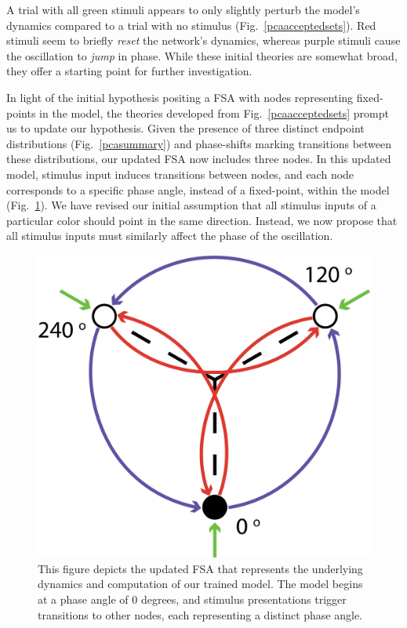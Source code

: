 \documentclass[conference]{IEEEtran}
\begin{document}
A trial with all green stimuli appears to only slightly perturb the model's dynamics compared to a trial with no stimulus (Fig.~\ref{pcaacceptedsets}). Red stimuli seem to briefly \textit{reset} the network's dynamics, whereas purple stimuli cause the oscillation to \textit{jump} in phase. While these initial theories are somewhat broad, they offer a starting point for further investigation.

In light of the initial hypothesis positing a FSA with nodes representing fixed-points in the model, the theories developed from Fig.~\ref{pcaacceptedsets} prompt us to update our hypothesis. Given the presence of three distinct endpoint distributions (Fig.~\ref{pcasummary}) and phase-shifts marking transitions between these distributions, our updated FSA now includes three nodes. In this updated model, stimulus input induces transitions between nodes, and each node corresponds to a specific phase angle, instead of a fixed-point, within the model (Fig.~\ref{resultingfsa}). We have revised our initial assumption that all stimulus inputs of a particular color should point in the same direction. Instead, we now propose that all stimulus inputs must similarly affect the phase of the oscillation.

\begin{figure}[htbp]
\centerline{\includegraphics[scale=0.125]{resulting_FSA.png}}
\caption{This figure depicts the updated FSA that represents the underlying dynamics and computation of our trained model. The model begins at a phase angle of $0$ degrees, and stimulus presentations trigger transitions to other nodes, each representing a distinct phase angle.}
\label{resultingfsa}
\end{figure}
\end{document}
